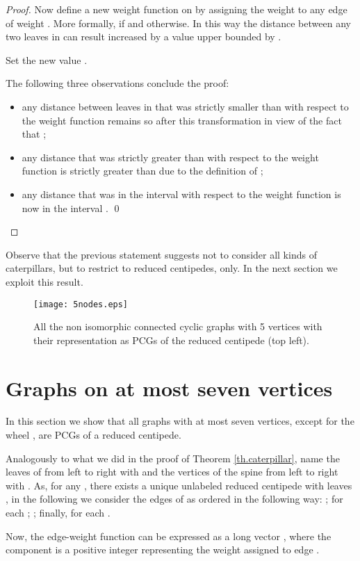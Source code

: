 \documentclass[review]{elsarticle}
\begin{document}
\begin{proof}
Now define a new weight function  on  by assigning the weight  to any edge of weight . More formally,  if  and  otherwise. 
In this way the distance between any two leaves in  can result increased by a value upper bounded by . 

Set the new value .

The following three observations conclude the proof:
\begin{itemize}
\item
any distance between leaves in  that was strictly smaller than  with respect to the weight function  remains so after this transformation in view of the fact that ;
\item
any distance that was strictly greater than  with respect to the weight function  is strictly greater than  due to the definition of ;
\item
any distance that was in the interval   with respect to the weight function  is now in the interval  . \qed
\end{itemize}
\end{proof}


Observe that the previous statement suggests not to consider all kinds of caterpillars, but to restrict to reduced centipedes, only.
In the next section we exploit this result.

\begin{figure}[!ht]
\centering
\texttt{[image: 5nodes.eps]}
\caption{All the non isomorphic connected cyclic graphs with 5 vertices with their representation as PCGs of the reduced centipede (top left).} \label{fig.5nodes}
\end{figure}

\section{Graphs on at most seven vertices}


In this section we show that all graphs with at most seven vertices, except for the wheel , are PCGs of a  reduced centipede. 

Analogously to what we did in the proof of Theorem \ref{th.caterpillar}, name the leaves of  from left to right with  and the vertices of the spine from left to right with .
As, for any , there exists a unique unlabeled reduced centipede with  leaves , in the following we consider the edges of  as ordered in the following way:
;  for each ; ; finally,  for each .

Now, the edge-weight function  can be expressed as a  long vector , where the component  is a positive integer representing the weight assigned to edge .
\end{document}
